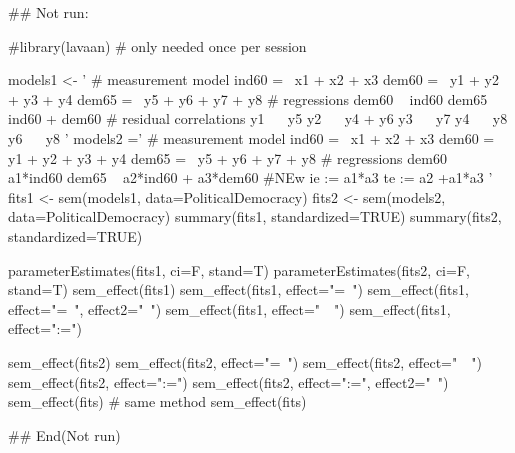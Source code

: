 \documentclass[a4paper]{book}
\begin{document}
\begin{Examples}
\begin{ExampleCode}
\#\# Not run: 

 #library(lavaan) # only needed once per session

models1 <- '
  # measurement model
    ind60 =~ x1 + x2 + x3
    dem60 =~ y1 + y2 + y3 + y4
    dem65 =~ y5 + y6 + y7 + y8
    # regressions
    dem60 ~ ind60
    dem65 ~ ind60 + dem60
      # residual correlations
    y1 ~~ y5
    y2 ~~ y4 + y6
    y3 ~~ y7
    y4 ~~ y8
    y6 ~~ y8
'
models2 ='
  # measurement model
    ind60 =~ x1 + x2 + x3
    dem60 =~ y1 + y2 + y3 + y4
    dem65 =~ y5 + y6 + y7 + y8
     # regressions
    dem60 ~ a1*ind60
    dem65 ~ a2*ind60 + a3*dem60
 #NEw
   ie := a1*a3
   te := a2 +a1*a3
'
fits1 <- sem(models1, data=PoliticalDemocracy)
fits2 <- sem(models2, data=PoliticalDemocracy)
summary(fits1, standardized=TRUE)
summary(fits2, standardized=TRUE)

parameterEstimates(fits1, ci=F, stand=T)
parameterEstimates(fits2, ci=F, stand=T)
sem_effect(fits1)
sem_effect(fits1, effect="=~")
sem_effect(fits1, effect="=~", effect2="~")
sem_effect(fits1, effect="~~")
sem_effect(fits1, effect=":=")

sem_effect(fits2)
sem_effect(fits2, effect="=~")
sem_effect(fits2, effect="~~")
sem_effect(fits2, effect=":=")
sem_effect(fits2, effect=":=", effect2="~")
 sem_effect(fits)%
 # same method
 sem_effect(fits)%


## End(Not run)


\end{ExampleCode}
\end{Examples}
\end{document}

